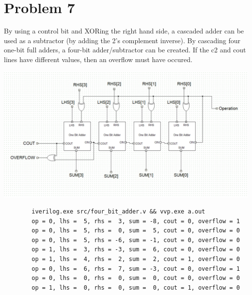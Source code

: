 \documentclass{article}
\newenvironment{problem}[1]{
  \nobreak\section*{Problem #1}
}{}
\begin{document}
  \begin{problem}{7}
    By using a control bit and XORing the right hand side, a cascaded adder can
    be used as a subtractor (by adding the 2's complement inverse).  By
    cascading four one-bit full adders, a four-bit adder/subtractor can be
    created.  If the c2 and cout lines have different values, then an overflow
    must have occured.

    \begin{center}
      
    \end{center}

    \begin{center}
      \includegraphics[scale=0.35]{images/four_bit_adder_subtractor.jpg}
    \end{center}

    \begin{center}
      \begin{lstlisting}
        iverilog.exe src/four_bit_adder.v && vvp.exe a.out
        op = 0, lhs =  5, rhs =  3, sum = -8, cout = 0, overflow = 1
        op = 0, lhs =  5, rhs =  0, sum =  5, cout = 0, overflow = 0
        op = 0, lhs =  5, rhs = -6, sum = -1, cout = 0, overflow = 0
        op = 1, lhs =  3, rhs = -3, sum =  6, cout = 0, overflow = 0
        op = 1, lhs =  4, rhs =  2, sum =  2, cout = 1, overflow = 0
        op = 0, lhs =  6, rhs =  7, sum = -3, cout = 0, overflow = 1
        op = 0, lhs =  0, rhs =  0, sum =  0, cout = 0, overflow = 0
        op = 1, lhs =  0, rhs =  0, sum =  0, cout = 1, overflow = 0
      \end{lstlisting}
    \end{center}
  \end{problem}
\end{document}

